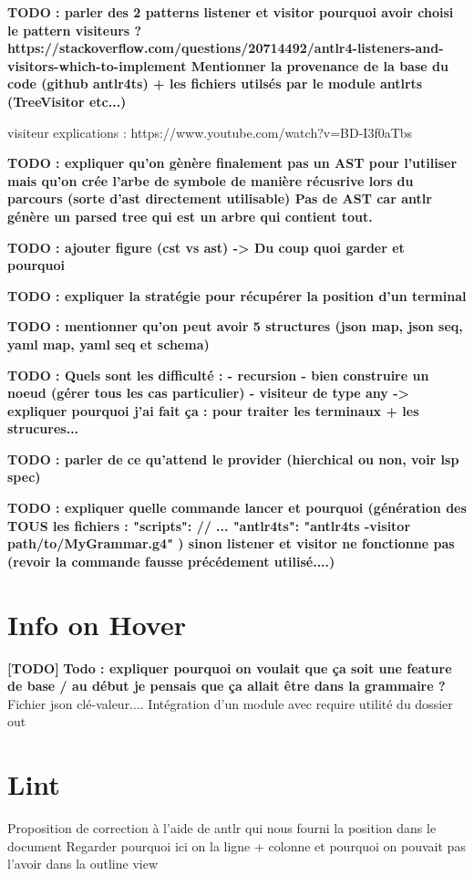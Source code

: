 \documentclass[
    iict, %
    il, %
]{heig-tb}
\begin{document}
\textbf{TODO : parler des 2 patterns listener et visitor
    pourquoi avoir choisi le pattern visiteurs ? https://stackoverflow.com/questions/20714492/antlr4-listeners-and-visitors-which-to-implement
    Mentionner la provenance de la base du code (github antlr4ts) + les fichiers utilsés par le module antlrts (TreeVisitor etc...)
}

visiteur explications : https://www.youtube.com/watch?v=BD-I3f0aTbs

\textbf{TODO : expliquer qu'on gènère finalement pas un AST pour l'utiliser mais qu'on crée l'arbe de symbole de manière récusrive lors du parcours (sorte d'ast directement utilisable)
    Pas de AST car antlr génère un parsed tree qui est un arbre qui contient tout.}


\textbf{TODO : ajouter figure (cst vs ast) -> Du coup quoi garder et pourquoi }

\textbf{TODO : expliquer la stratégie pour récupérer la position d'un terminal}

\textbf{TODO : mentionner qu'on peut avoir 5 structures (json map, json seq, yaml map, yaml seq et schema) }

\textbf{
    TODO :
    Quels sont les difficulté :
    - recursion
    - bien construire un noeud (gérer tous les cas particulier)
    - visiteur de type any -> expliquer pourquoi j'ai fait ça : pour traiter les terminaux + les strucures...
}

\textbf{TODO : parler de ce qu'attend le provider (hierchical ou non, voir lsp spec)}

\textbf{TODO : expliquer quelle commande lancer et pourquoi (génération des TOUS les fichiers :
"scripts": {
// ...
"antlr4ts": "antlr4ts -visitor path/to/MyGrammar.g4"
}) sinon listener et visitor ne fonctionne pas (revoir la commande fausse précédement utilisé....)}


\section{Info on Hover}
\textbf{[TODO]}
\textbf{Todo : expliquer pourquoi on voulait que ça soit une feature de base / au début je pensais que ça allait être dans la grammaire ?}
Fichier json clé-valeur....
Intégration d'un module avec require
utilité du dossier out

\section{Lint}

Proposition de correction à l'aide de antlr qui nous fourni la position dans le document
Regarder pourquoi ici on la ligne + colonne et pourquoi on pouvait pas l'avoir dans la outline view
\end{document}
